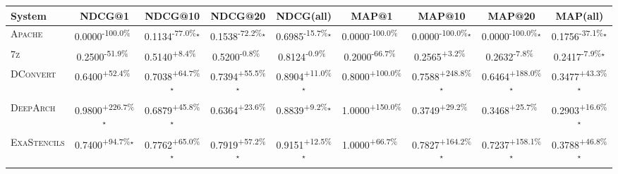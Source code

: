 \begin{table}[htbp]
\centering
\renewcommand{\arraystretch}{1.2}
\begin{tabular}{l|cccc|cccc}
\hline
System & NDCG@1 & NDCG@10 & NDCG@20 & NDCG(all) & MAP@1 & MAP@10 & MAP@20 & MAP(all) \\ \hline
\textsc{Apache} & \cellcolor{red!30}0.0000\textsuperscript{-100.0\%}$^{\,\,\,}$ & \cellcolor{red!30}0.1134\textsuperscript{-77.0\%}$^\star$ & \cellcolor{red!30}0.1538\textsuperscript{-72.2\%}$^\star$ & \cellcolor{red!30}0.6985\textsuperscript{-15.7\%}$^\star$ & \cellcolor{red!30}0.0000\textsuperscript{-100.0\%}$^{\,\,\,}$ & \cellcolor{red!30}0.0000\textsuperscript{-100.0\%}$^\star$ & \cellcolor{red!30}0.0000\textsuperscript{-100.0\%}$^\star$ & \cellcolor{red!30}0.1756\textsuperscript{-37.1\%}$^\star$ \\
\textsc{7z} & \cellcolor{red!30}0.2500\textsuperscript{-51.9\%}$^{\,\,\,}$ & \cellcolor{green!30}0.5140\textsuperscript{+8.4\%}$^{\,\,\,}$ & \cellcolor{red!30}0.5200\textsuperscript{-0.8\%}$^{\,\,\,}$ & \cellcolor{red!30}0.8124\textsuperscript{-0.9\%}$^{\,\,\,}$ & \cellcolor{red!30}0.2000\textsuperscript{-66.7\%}$^{\,\,\,}$ & \cellcolor{green!30}0.2565\textsuperscript{+3.2\%}$^{\,\,\,}$ & \cellcolor{red!30}0.2632\textsuperscript{-7.8\%}$^{\,\,\,}$ & \cellcolor{red!30}0.2417\textsuperscript{-7.9\%}$^\star$ \\
\textsc{DConvert} & \cellcolor{green!30}0.6400\textsuperscript{+52.4\%}$^{\,\,\,}$ & \cellcolor{green!30}0.7038\textsuperscript{+64.7\%}$^\star$ & \cellcolor{green!30}0.7394\textsuperscript{+55.5\%}$^\star$ & \cellcolor{green!30}0.8904\textsuperscript{+11.0\%}$^\star$ & \cellcolor{green!30}0.8000\textsuperscript{+100.0\%}$^{\,\,\,}$ & \cellcolor{green!30}0.7588\textsuperscript{+248.8\%}$^\star$ & \cellcolor{green!30}0.6464\textsuperscript{+188.0\%}$^\star$ & \cellcolor{green!30}0.3477\textsuperscript{+43.3\%}$^\star$ \\
\textsc{DeepArch} & \cellcolor{green!30}0.9800\textsuperscript{+226.7\%}$^\star$ & \cellcolor{green!30}0.6879\textsuperscript{+45.8\%}$^\star$ & \cellcolor{green!30}0.6364\textsuperscript{+23.6\%}$^{\,\,\,}$ & \cellcolor{green!30}0.8839\textsuperscript{+9.2\%}$^\star$ & \cellcolor{green!30}1.0000\textsuperscript{+150.0\%}$^{\,\,\,}$ & \cellcolor{green!30}0.3749\textsuperscript{+29.2\%}$^{\,\,\,}$ & \cellcolor{green!30}0.3468\textsuperscript{+25.7\%}$^{\,\,\,}$ & \cellcolor{green!30}0.2903\textsuperscript{+16.6\%}$^\star$ \\
\textsc{ExaStencils} & \cellcolor{green!30}0.7400\textsuperscript{+94.7\%}$^\star$ & \cellcolor{green!30}0.7762\textsuperscript{+65.0\%}$^\star$ & \cellcolor{green!30}0.7919\textsuperscript{+57.2\%}$^\star$ & \cellcolor{green!30}0.9151\textsuperscript{+12.5\%}$^\star$ & \cellcolor{green!30}1.0000\textsuperscript{+66.7\%}$^{\,\,\,}$ & \cellcolor{green!30}0.7827\textsuperscript{+164.2\%}$^\star$ & \cellcolor{green!30}0.7237\textsuperscript{+158.1\%}$^\star$ & \cellcolor{green!30}0.3788\textsuperscript{+46.8\%}$^\star$ \\

\end{tabular}
\end{table}
